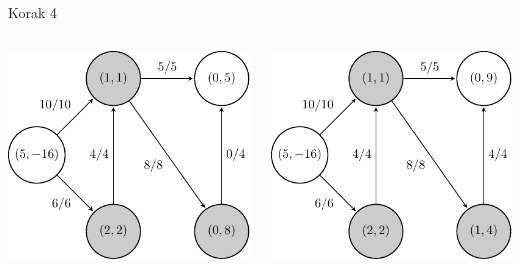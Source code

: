 \documentclass{beamer}
\begin{document}
\begin{frame}{Korak 4}
    \begin{columns}
        \begin{column}{0.5\textwidth}
            \centering
            \includegraphics[scale=0.7]{../writing/images/graf2-5.pdf}
        \end{column}
        \pause
        \begin{column}{0.5\textwidth}
            \centering
            \includegraphics[scale=0.7]{../writing/images/graf2-6.pdf}
        \end{column}
    \end{columns}
\end{frame}
\end{document}
